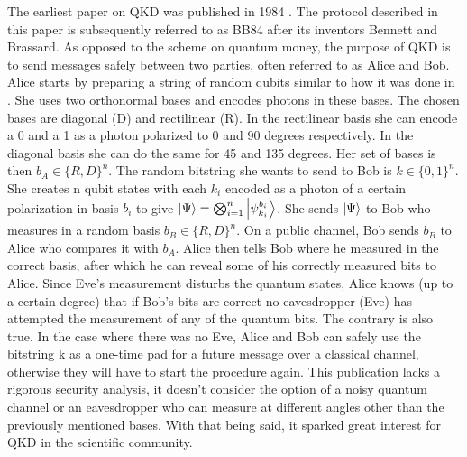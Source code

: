 \documentclass[%
 reprint,
nofootinbib,
 amsmath,amssymb,
 aps,
]{revtex4-2}
\begin{document}
The earliest paper on QKD was published in 1984 \cite{BB84, bennett2014quantum}. The protocol described in this paper is subsequently referred to as BB84 after its inventors Bennett and Brassard. As opposed to the scheme on quantum money, the purpose of QKD is to send messages safely between two parties, often referred to as Alice and Bob. Alice starts by preparing a string of random qubits similar to how it was done in \cite{WeisnerConjugateCoding}. She uses two orthonormal bases and encodes photons in these bases. The chosen bases are diagonal (D) and rectilinear (R). In the rectilinear basis she can encode a 0 and a 1 as a photon polarized to 0 and 90 degrees respectively. In the diagonal basis she can do the same for 45 and 135 degrees. Her set of bases is then $b_A \in \{R, D\}^n$. The random bitstring she wants to send to Bob is $k \in \{0,1\}^n $. She creates n qubit states with each $k_i$ encoded as a photon of a certain polarization in basis $b_i$ to give $\ket{\Psi} = \bigotimes_{i=1}^n \ket{\psi_{k_i}^{b_i}} $. She sends $\ket{\Psi}$ to Bob who measures in a random basis $b_B \in \{R, D\}^n$. On a public channel, Bob sends $b_B$ to Alice who compares it with $b_A$. Alice then tells Bob where he measured in the correct basis, after which he can reveal some of his correctly measured bits to Alice. Since Eve's measurement disturbs the quantum states, Alice knows (up to a certain degree) that if Bob's bits are correct no eavesdropper (Eve) has attempted the measurement of any of the quantum bits. The contrary is also true. In the case where there was no Eve, Alice and Bob can safely use the bitstring k as a one-time pad \cite{shannon1949communication} for a future message over a classical channel, otherwise they will have to start the procedure again. This publication \cite{BB84} lacks a rigorous security analysis, it doesn't consider the option of a noisy quantum channel or an eavesdropper who can measure at different angles other than the previously mentioned bases. With that being said, it sparked great interest for QKD in the scientific community. 
\end{document}
